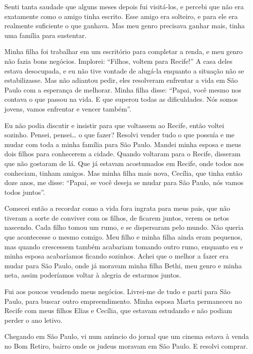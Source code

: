 Senti tanta saudade que alguns meses depois fui visitá-los, e
percebi que não era exatamente como o amigo tinha escrito. Esse amigo era solteiro, e para ele era realmente suficiente o que ganhava. Mas meu genro precisava ganhar mais, tinha uma família para sustentar.

Minha filha foi trabalhar em um escritório para completar a renda, e 
meu genro não fazia bons negócios. Implorei: ``Filhos, voltem para
Recife!'' A casa deles estava desocupada, e eu não tive vontade de
alugá-la enquanto a situação não se estabilizasse. Mas não adiantou pedir, eles resolveram enfrentar a vida em São
Paulo com a esperança de melhorar. Minha filha disse:
``Papai, você mesmo nos contava o que passou na vida. E que superou
todas as dificuldades. Nós somos jovens, vamos enfrentar e
vencer também''.

Eu não podia discutir e insistir para que voltassem ao Recife, então 
voltei sozinho. Pensei, pensei\ldots{} o que fazer? Resolvi vender tudo o que
possuía e me mudar com toda a minha família para São Paulo. Mandei minha
esposa e meus dois filhos para conhecerem a cidade. Quando 
voltaram para o Recife, disseram que não gostaram de lá. 
Que já estavam acostumados em Recife, onde todos nos conheciam,
tinham amigos. Mas minha filha mais nova, Cecília, que tinha então doze
anos, me disse: ``Papai, se você deseja se mudar para São Paulo, nós
vamos todos juntos''.

Comecei então a recordar como a vida fora ingrata para meus pais, que não
tiveram a sorte de conviver com os filhos, de ficarem juntos, verem os
netos nascendo. Cada filho tomou um rumo, e se dispersaram
pelo mundo. Não queria que acontecesse o mesmo comigo. Meu filho e
minha filha ainda eram pequenos, mas quando crescessem também
acabariam tomando outro rumo, enquanto eu e minha esposa acabaríamos ficando sozinhos.
Achei que o melhor a fazer era mudar para São Paulo, onde já
moravam minha filha Bethi, meu genro e minha neta, assim poderíamos voltar à alegria de estarmos juntos.

Fui aos poucos vendendo meus negócios. Livrei-me de tudo e parti para São
Paulo, para buscar outro empreendimento. Minha esposa Marta
permaneceu no Recife com meus filhos Elias e Cecília, que estavam
estudando e não podiam perder o ano letivo.

Chegando em São Paulo, vi num anúncio do jornal que um cinema estava à venda no Bom 
Retiro, bairro onde os judeus moravam em São Paulo. E 
resolvi comprar.

